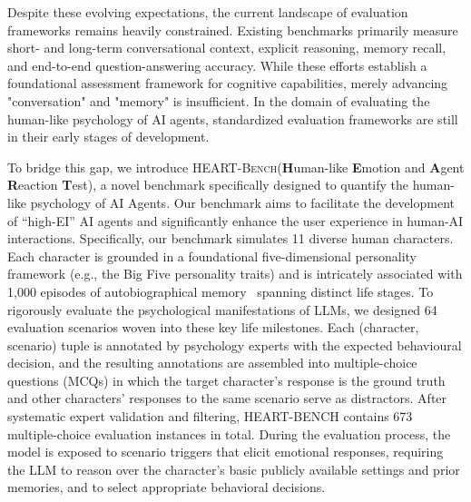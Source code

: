 \documentclass{article}
\newcommand{\ourbench}[0]{\textsc{HEART-Bench}\xspace}
\begin{document}
Despite these evolving expectations, the current landscape of evaluation frameworks remains heavily constrained. Existing benchmarks primarily measure short- and long-term conversational context, explicit reasoning, memory recall, and end-to-end question-answering accuracy. While these efforts establish a foundational assessment framework for cognitive capabilities, merely advancing "conversation" and "memory" is insufficient. In the domain of evaluating the human-like psychology of AI agents, standardized evaluation frameworks are still in their early stages of development.

To bridge this gap, we introduce \ourbench (\textbf{H}uman-like \textbf{E}motion and \textbf{A}gent \textbf{R}eaction \textbf{T}est), a novel benchmark specifically designed to quantify the human-like psychology of AI Agents. Our benchmark aims to facilitate the development of ``high-EI'' AI agents and significantly enhance the user experience in human-AI interactions.
Specifically, our benchmark simulates 11 diverse human characters. Each character is grounded in a foundational five-dimensional personality framework (e.g., the Big Five personality traits) and is intricately associated with 1,000 episodes of autobiographical memory~\cite{singer1995seeing} spanning distinct life stages. To rigorously evaluate the psychological manifestations of LLMs, we designed 64 evaluation scenarios woven into these key life milestones. Each (character, scenario) tuple is annotated by psychology experts with the expected behavioural decision, and the resulting annotations are assembled into multiple-choice questions (MCQs) in which the target character's response is the ground truth and other characters' responses to the same scenario serve as distractors. After systematic expert validation and filtering, HEART-BENCH contains 673 multiple-choice evaluation instances in total. During the evaluation process, the model is exposed to scenario triggers that elicit emotional responses, requiring the LLM to reason over the character’s basic publicly available settings and prior memories, and to select appropriate behavioral decisions.
\end{document}
